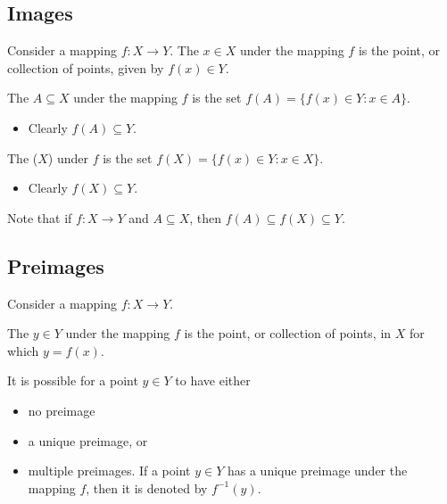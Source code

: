 \documentclass[letterpaper,10pt,english]{jupyterBook}
\begin{document}
\subsection{Images}
\label{\detokenize{03.mappings_functions_correspondences:images}}
\sphinxAtStartPar
Consider a mapping \(f: X \rightarrow Y\).
The  \(x \in X\) under the mapping \(f\) is the point, or collection of points, given by \(f(x) \in Y\).

\sphinxAtStartPar
The  \(A \subseteq X\) under the mapping \(f\) is the set \(f(A) = \{f(x) \in Y : x \in A\}\).
\begin{itemize}
\item {} 
\sphinxAtStartPar
Clearly \(f(A) \subseteq Y\).

\end{itemize}

\sphinxAtStartPar
The  (\(X\)) under \(f\) is the set \(f(X) = \{f(x) \in Y : x \in X \}\).
\begin{itemize}
\item {} 
\sphinxAtStartPar
Clearly \(f(X) \subseteq Y\).

\end{itemize}

\sphinxAtStartPar
Note that if \(f: X \rightarrow Y\) and \(A \subseteq X\), then \(f(A) \subseteq f(X) \subseteq Y\).


\subsection{Pre\sphinxhyphen{}images}
\label{\detokenize{03.mappings_functions_correspondences:pre-images}}
\sphinxAtStartPar
Consider a mapping \(f: X \rightarrow Y\).

\sphinxAtStartPar
The   \(y \in Y\) under the mapping \(f\) is the point, or collection of points, in \(X\) for which \(y = f(x)\).

\sphinxAtStartPar
It is possible for a point \(y \in Y\) to have either
\begin{itemize}
\item {} 
\sphinxAtStartPar
no pre\sphinxhyphen{}image

\item {} 
\sphinxAtStartPar
a unique pre\sphinxhyphen{}image, or

\item {} 
\sphinxAtStartPar
multiple pre\sphinxhyphen{}images.
If a point \(y \in Y\) has a unique pre\sphinxhyphen{}image under the mapping \(f\), then it is denoted by \(f^{−1}(y)\).

\end{itemize}
\end{document}
